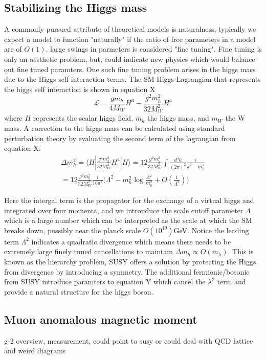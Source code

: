 \subsection{Stabilizing the Higgs mass}

A commonly pursued attribute of theoretical models is naturalness, typically we expect a model to function "naturally" if the ratio of free parameters in a model are of $O(1)$, large swings in parmeters is considered "fine tuning". Fine tuning is only an aesthetic problem, but, could indicate new physics which would balance out fine tuned paramters. One such fine tuning problem arises in the higgs mass due to the Higgs self interaction terms. The SM Higgs Lagrangian that represents the higgs self interaction is shown in equation X
\begin{equation}
\mathcal{L}=\frac{gm_h}{4M_W}H^3 - \frac{g^2m_h^2}{32M_W^2}H^4
\end{equation}
where $H$ represents the scalar higgs field, $m_h$ the higgs mass, and $m_W$ the W mass. A correction to the higgs mass can be calculated using standard perturbation theory by evaluating the second term of the lagrangian from equation X. 
\begin{equation}
\begin{split}
\Delta m_h^2 = \langle H | \frac{g^2m_h^2}{32M_W^2} H^4 | H  \rangle = 12\frac{g^2m_h^2}{32M_W^2}\int \frac{d^4 k}{(2\pi)^2} \frac{i}{k^2 - m_h^2}\\
= 12\frac{g^2m_h^2}{32M_W^2} \frac{1}{16\pi^2}\big( \Lambda^2 - m_h^2\log\frac{\Lambda^2}{m_h^2} + O(\frac{1}{\Lambda^2})\big)
\end{split} 
\end{equation}
 
 Here the intergal term is the propagator for the exchange of a virtual higgs and integrated over four  momenta, and we introuduce the scale cutoff parameter $\Lambda$ which is a large number which can be interpreted as the scale at which the SM breaks down, possibly near the planck scale $O(10^{19})$GeV. Notice the leading term $\Lambda^2$ indicates a quadratic divergence which means there needs to be extremely large finely tuned cancellations to maintain $\Delta m_h \propto O(m_h)$. This is known as the hierarchy problem, SUSY offers a solution by protecting the Higgs from divergence by introducing a symmetry. The additional fermionic/bosonic from SUSY introduce paramters to equation Y which cancel the $\lambda^2$ term and provide a natural structure for the higgs boson. 


\subsection{Muon anomalous magnetic moment}
g-2 overview, measurement, could point to susy or could deal with QCD lattice and weird diagrams

